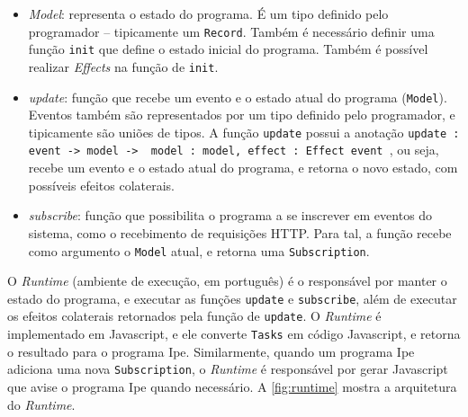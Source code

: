 \begin{itemize}
    \item \textit{Model}: representa o estado do programa. É um tipo definido
          pelo programador -- tipicamente um \texttt{Record}. Também é necessário definir
          uma função \texttt{init} que define o estado inicial do programa. Também
          é possível realizar \textit{Effects} na função de \texttt{init}.
    \item \textit{update}: função que recebe um evento e o estado atual do programa
          (\texttt{Model}). Eventos também são representados por um tipo definido pelo
          programador, e tipicamente são uniões de tipos. A função \texttt{update} possui
          a anotação \texttt{update : event -> model -> { model : model, effect : Effect event }},
          ou seja, recebe um evento e o estado atual do programa, e retorna o novo estado,
          com possíveis efeitos colaterais.
    \item \textit{subscribe}: função que possibilita o programa a se inscrever
          em eventos do sistema, como o recebimento de requisições HTTP. Para tal,
          a função recebe como argumento o \texttt{Model} atual, e retorna uma
          \texttt{Subscription}.
\end{itemize}

O \textit{Runtime} (ambiente de execução, em português) é o responsável por manter
o estado do programa, e executar as funções \texttt{update} e \texttt{subscribe},
além de executar os efeitos colaterais retornados pela função de \texttt{update}.
O \textit{Runtime} é implementado em Javascript, e ele converte \texttt{Tasks} em
código Javascript, e retorna o resultado para o programa Ipe.  Similarmente, quando
um programa Ipe adiciona uma nova \texttt{Subscription}, o \textit{Runtime} é
responsável por gerar Javascript que avise o programa Ipe quando necessário. A
\autoref{fig:runtime} mostra a arquitetura do \textit{Runtime}.


